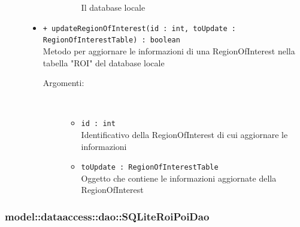 \documentclass[../DefinizioneDiProdotto.tex]{subfiles}
\begin{document}
\begin{description}
\begin{itemize}
\begin{description}
\begin{itemize}
Il database locale\end{itemize}
\end{description}
\item \texttt{+ updateRegionOfInterest(id : int, toUpdate : RegionOfInterestTable) : boolean}\\
Metodo per aggiornare le informazioni di una RegionOfInterest nella tabella "ROI" del database locale
 \begin{description}
\item[Argomenti:] \
\begin{itemize}
\item \texttt{id : int}\\
Identificativo della RegionOfInterest di cui aggiornare le informazioni\item \texttt{toUpdate : RegionOfInterestTable}\\
Oggetto che contiene le informazioni aggiornate della RegionOfInterest\end{itemize}
\end{description}
\end{itemize}
\end{description}

\subsubsection{model::dataaccess::dao::SQLiteRoiPoiDao}
\end{document}
